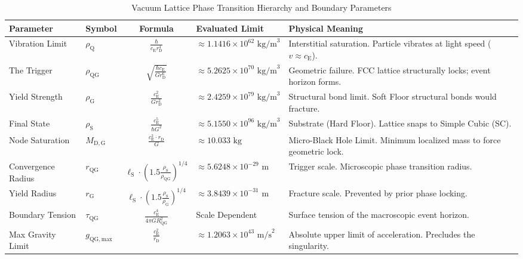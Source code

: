 \begin{table}[H]
    \centering
    \caption{Vacuum Lattice Phase Transition Hierarchy and Boundary Parameters}
    \label{tab:phase_transitions}
    \vspace{0.2cm}
    \renewcommand{\arraystretch}{1.5}
    \setlength{\tabcolsep}{4pt}
    \small
    \begin{tabular}{@{}llclp{}@{}}
        \toprule
        \textbf{Parameter} & \textbf{Symbol} & \textbf{Formula} & \textbf{Evaluated Limit} & \textbf{Physical Meaning} \\
        \midrule
        Vibration Limit & $\rho_{\mathrm{Q}}$ & $\frac{\hbar}{c_{\mathrm{E}} r_{\mathrm{D}}^4}$ & $\approx 1.1416 \times 10^{62} \text{ kg/m}^3$ & Interstitial saturation. Particle vibrates at light speed ($v \approx c_{\mathrm{E}}$). \\
        The Trigger & $\rho_{\mathrm{QG}}$ & $\sqrt{\frac{\hbar c_{\mathrm{E}}}{G r_{\mathrm{D}}^6}}$ & $\approx 5.2625 \times 10^{70} \text{ kg/m}^3$ & Geometric failure. FCC lattice structurally locks; event horizon forms. \\
        Yield Strength & $\rho_{\mathrm{G}}$ & $\frac{c_{\mathrm{E}}^2}{G r_{\mathrm{D}}^2}$ & $\approx 2.4259 \times 10^{79} \text{ kg/m}^3$ & Structural bond limit. Soft Floor structural bonds would fracture. \\
        Final State & $\rho_{\mathrm{S}}$ & $\frac{c_{\mathrm{E}}^5}{\hbar G^2}$ & $\approx 5.1550 \times 10^{96} \text{ kg/m}^3$ & Substrate (Hard Floor). Lattice snaps to Simple Cubic (SC). \\
        Node Saturation & $M_{\mathrm{D,G}}$ & $\frac{c_{\mathrm{E}}^2 \cdot r_{\mathrm{D}}}{G}$ & $\approx 10.033 \text{ kg}$ & Micro-Black Hole Limit. Minimum localized mass to force geometric lock. \\
        \midrule
        Convergence Radius & $r_{\mathrm{QG}}$ & $\ell_{\mathrm{S}} \cdot \left(1.5 \frac{\rho_{\mathrm{S}}}{\rho_{\mathrm{QG}}}\right)^{1/4}$ & $\approx 5.6248 \times 10^{-29} \text{ m}$ & Trigger scale. Microscopic phase transition radius. \\
        Yield Radius & $r_{\mathrm{G}}$ & $\ell_{\mathrm{S}} \cdot \left(1.5 \frac{\rho_{\mathrm{S}}}{\rho_{\mathrm{G}}}\right)^{1/4}$ & $\approx 3.8439 \times 10^{-31} \text{ m}$ & Fracture scale. Prevented by prior phase locking. \\
        Boundary Tension & $\tau_{\mathrm{QG}}$ & $\frac{c_{\mathrm{E}}^4}{4\pi G R_{\mathrm{QG}}^2}$ & Scale Dependent & Surface tension of the macroscopic event horizon. \\
        Max Gravity Limit & $g_{\mathrm{QG,max}}$ & $\frac{c_{\mathrm{E}}^2}{r_{\mathrm{D}}}$ & $\approx 1.2063 \times 10^{43} \text{ m/s}^2$ & Absolute upper limit of acceleration. Precludes the singularity. \\
        \bottomrule
    \end{tabular}
\end{table}
